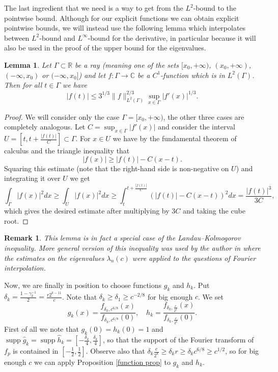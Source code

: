 \documentclass[12pt]{amsart}
\numberwithin{equation}{section}
\newcommand{\R}{\mathbb{R}}
\newcommand{\Cm}{\mathbb{C}}
\DeclareMathOperator{\supp}{supp} \DeclareMathOperator{\trace}{tr}
\newtheorem{lemma}[Thm]{Lemma}
\newtheorem{remark}[Thm]{Remark}
\begin{document}
The last ingredient that we need is a way to get from the $L^2$-bound to the pointwise bound. Although for our explicit functions we can obtain explicit pointwise bounds, we will instead use the following lemma which interpolates between $L^2$-bound and $L^\infty$-bound for the derivative, in particular because it will also be used in the proof of the upper bound for the eigenvalues. 
\begin{lemma}\label{Kolm}
Let $\Gamma\subset \R$ be a ray (meaning one of the sets $[x_0,+\infty)$, $(x_0,+\infty)$, $(-\infty,x_0)$ or $(-\infty, x_0]$) and let $f:\Gamma\to\Cm$ be a $C^1$-function which is in $L^2(\Gamma)$. Then for all $t\in \Gamma$ we have
$$|f(t)|\le 3^{1/3} \|f\|_{L^2(\Gamma)}^{2/3}\sup_{x\in\Gamma} |f'(x)|^{1/3}.$$
\end{lemma}
\begin{proof}
We will consider only the case $\Gamma = [x_0,+\infty)$, the other three cases are completely analogous. Let $C = \sup_{x\in\Gamma} |f'(x)|$ and consider the interval $U=\left[t, t+\frac{|f(t)|}{C}\right]\subset\Gamma$. For $x\in U$ we have by the fundamental theorem of calculus and the triangle inequality that $$|f(x)|\ge |f(t)| - C(x-t).$$
Squaring this estimate (note that the right-hand side is non-negative on $U$) and integrating it over $U$ we get
$$\int_\Gamma |f(x)|^2dx \ge \int_U |f(x)|^2dx \ge \int_t^{t+\frac{|f(t)|}{C}} (|f(t)|-C(x-t))^2dx=\frac{|f(t)|^3}{3C},$$
which gives the desired estimate after multiplying by $3C$ and taking the cube root.
\end{proof}
\begin{remark}This lemma is in fact a special case of the Landau--Kolmogorov inequality. More general version of this inequality was used by the author in \cite{KulikovFI} where the estimates on the eigenvalues $\lambda_n(c)$ were applied to the questions of Fourier interpolation.
\end{remark}
Now, we are finally in position to choose functions $g_k$ and $h_k$. Put $\delta_k = \frac{1-\gamma_k^{-1}}{2} = \frac{r2^{k-11}}{c}$. Note that $\delta_k \ge \delta_1 \ge c^{-2/8}$ for big enough $c$. We set $$g_k(x) = \frac{f_{\delta_k, c^{6/8}}(x)}{f_{\delta_k, c^{6/8}}(0)},\quad h_k = \frac{f_{\delta_k, \frac{c}{2^k}}(x)}{f_{\delta_k, \frac{c}{2^k}}(0)}.$$
First of all we note that $g_k(0) = h_k(0) = 1$ and $\supp \widehat{g}_k = \supp \widehat{h}_k = [-\frac{\delta_k}{4},\frac{\delta_k}{4}]$, so that the support of the Fourier transform of $f_p$ is contained in $[-\frac{1}{2},\frac{1}{2}]$. Observe also that $\delta_k \frac{c}{2^k} \ge \delta_k r \ge \delta_k c^{6/8} \ge c^{1/2}$, so for big enough $c$ we can apply Proposition \ref{function prop} to $g_k$ and $h_k$.
\end{document}
